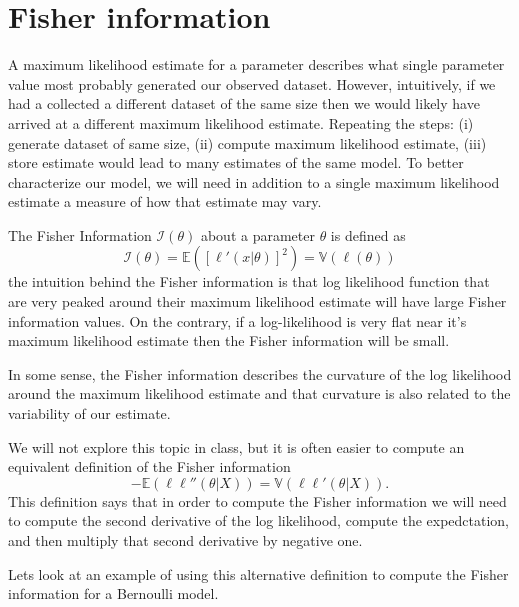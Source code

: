\section{Fisher information}

A maximum likelihood estimate for a parameter describes what single parameter value most probably generated our observed dataset.
However, intuitively, if we had a collected a different dataset of the same size then we would likely have arrived at a different maximum likelihood estimate. 
Repeating the steps: (i) generate dataset of same size, (ii) compute maximum likelihood estimate, (iii) store estimate would lead to many estimates of the same model.  
To better characterize our model, we will need in addition to a single maximum likelihood estimate a measure of how that estimate may vary.

The Fisher Information $\mathcal{I}(\theta)$ about a parameter $\theta$ is defined as 
\begin{equation}
    \mathcal{I}(\theta) = \mathbb{E}\left( \left[ \ell'(x | \theta) \right]^{2} \right) = \mathbb{V}\left(\ell(\theta)\right)
\end{equation}
the intuition behind the Fisher information is that log likelihood function that are very peaked around their maximum likelihood estimate will have large Fisher information values. 
On the contrary, if a log-likelihood is very flat near it's maximum likelihood estimate then the Fisher information will be small.
 
In some sense, the Fisher information describes the curvature of the log likelihood around the maximum likelihood estimate and that curvature is also related to the variability of our estimate.

We will not explore this topic in class, but it is often easier to compute an equivalent definition of the Fisher information
\begin{equation}
    -\mathbb{E}( \ell \ell ''(\theta | X) ) = \mathbb{V}( \ell \ell ' (\theta | X)  ).
\end{equation}
This definition says that in order to compute the Fisher information we will need to compute the second derivative of the log likelihood, compute the expedctation, and then multiply that second derivative by negative one.

Lets look at an example of using this alternative definition to compute the Fisher information for a Bernoulli model.

